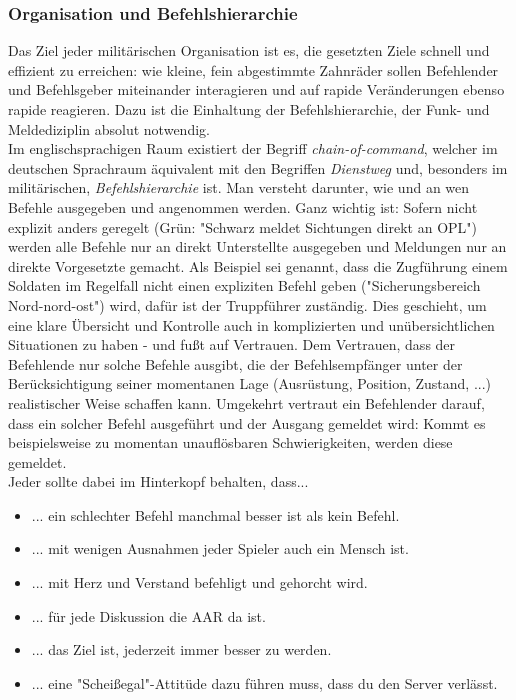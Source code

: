 \subsubsection{Organisation und Befehlshierarchie}
Das Ziel jeder militärischen Organisation ist es, die gesetzten Ziele schnell und effizient zu erreichen: wie kleine, fein abgestimmte Zahnräder sollen Befehlender und Befehlsgeber miteinander interagieren und auf rapide Veränderungen ebenso rapide reagieren. Dazu ist die Einhaltung der Befehlshierarchie, der Funk- und Meldediziplin absolut notwendig.
\\Im englischsprachigen Raum existiert der Begriff \textit{chain-of-command}, welcher im deutschen Sprachraum äquivalent mit den Begriffen \textit{Dienstweg} und, besonders im militärischen, \textit{Befehlshierarchie} ist. Man versteht darunter, wie und an wen Befehle ausgegeben und angenommen werden. Ganz wichtig ist: Sofern nicht explizit anders geregelt (Grün: "Schwarz meldet Sichtungen direkt an \ac{OPL}") werden alle Befehle nur an direkt Unterstellte ausgegeben und Meldungen nur an direkte Vorgesetzte gemacht. Als Beispiel sei genannt, dass die Zugführung einem Soldaten im Regelfall nicht einen expliziten Befehl geben ("Sicherungsbereich Nord-nord-ost") wird, dafür ist der Truppführer zuständig. Dies geschieht, um eine klare Übersicht und Kontrolle auch in komplizierten und unübersichtlichen Situationen zu haben - und fußt auf Vertrauen. Dem Vertrauen, dass der Befehlende nur solche Befehle ausgibt, die der Befehlsempfänger unter der Berücksichtigung seiner momentanen Lage (Ausrüstung, Position, Zustand, ...) realistischer Weise schaffen kann. Umgekehrt vertraut ein Befehlender darauf, dass ein solcher Befehl ausgeführt und der Ausgang gemeldet wird: Kommt es beispielsweise zu momentan unauflösbaren Schwierigkeiten, werden diese gemeldet.
\\Jeder sollte dabei im Hinterkopf behalten, dass...
\begin{itemize}
	\item ... ein schlechter Befehl manchmal besser ist als kein Befehl.
	\item ... mit wenigen Ausnahmen jeder Spieler auch ein Mensch ist. 
	\item ... mit Herz und Verstand befehligt und gehorcht wird. 
	\item ... für jede Diskussion die \ac{AAR} da ist.
	\item ... das Ziel ist, jederzeit immer besser zu werden.
	\item ... eine "Scheißegal"-Attitüde dazu führen muss, dass du den Server verlässt.
\end{itemize}
